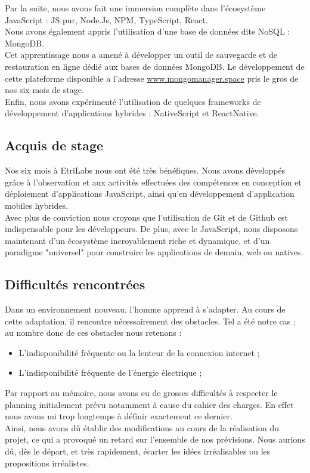 Par la suite, nous avons fait une immersion complète dans l'écosystème JavaScript : JS pur, Node.Js, NPM, TypeScript, React.
\\Nous avons également appris l’utilisation d’une base de données dite NoSQL : MongoDB.
\\Cet apprentissage nous a amené à développer un outil de sauvegarde et de restauration en ligne dédié aux bases de données MongoDB. Le développement de cette plateforme disponible a l’adresse \url{www.mongomanager.space} pris le gros de nos six mois de stage.
\\Enfin, nous avons expérimenté l’utilisation de quelques frameworks de développement d’applications hybrides : NativeScript et ReactNative.
\newpage
\subsection{Acquis de stage}
Nos six mois à EtriLabs nous ont été très bénéfiques. Nous avons développés grâce à l’observation et aux activités effectuées des compétences en conception et déploiement d’applications JavaScript, ainsi qu’en développement d’application mobiles hybrides.
\\Avec plus de conviction nous croyons que l’utilisation de Git et de Github est indispensable pour les développeurs. De plus, avec le JavaScript, nous disposons maintenant d'un écosystème incroyablement riche et dynamique, et d'un paradigme "universel" pour construire les applications de demain, web ou natives.

\subsection{Difficultés rencontrées}
Dans un environnement nouveau, l’homme apprend à s’adapter. Au cours de cette adaptation, il rencontre nécessairement des obstacles. Tel a été notre cas ; au nombre donc de ces obstacles nous retenons :
\begin{itemize}
\item[\textbullet] L’indisponibilité fréquente ou la lenteur de la connexion internet ;
\item[\textbullet] L’indisponibilité fréquente de l'énergie électrique ;
\end{itemize}

Par rapport au mémoire, nous avons eu de grosses difficultés à respecter le planning initialement prévu notamment à cause du cahier des charges. En effet nous avons mi trop longtemps à définir exactement ce dernier.
\\Ainsi, nous avons dû établir des modifications au cours de la réalisation du projet, ce qui a provoqué un retard sur l’ensemble de nos prévisions. Nous aurions dû, dès le départ, et très rapidement, écarter les idées irréalisables ou les propositions irréalistes.